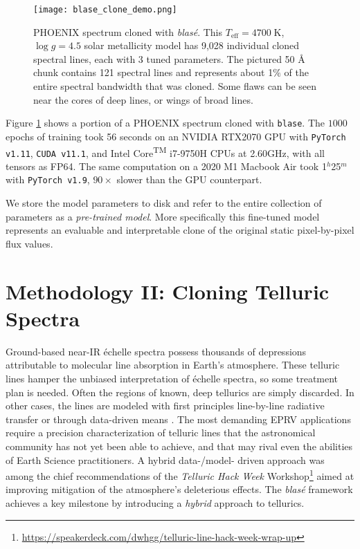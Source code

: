 \documentclass[trackchanges]{aastex631}
\begin{document}
\begin{figure}[hbt!]
    \centering
    \texttt{[image: blase\_clone\_demo.png]}
    \caption{PHOENIX spectrum cloned with \emph{blas\'e}.  This $T_{\mathrm{eff}}=4700\;$K,  $\log{g}=4.5$ solar metallicity model has 9,028 individual cloned spectral lines, each with 3 tuned parameters.  The pictured 50 \AA~ chunk contains 121 spectral lines and represents about 1$\%$ of the entire spectral bandwidth that was cloned.  Some flaws can be seen near the cores of deep lines, or wings of broad lines.}
    \label{fig_cloned_spectrum_demo}
\end{figure}


Figure \ref{fig_cloned_spectrum_demo} shows a portion of a PHOENIX spectrum cloned with \texttt{blase}. The $1000$ epochs of training took 56 seconds on an NVIDIA\textsuperscript{\tiny\textregistered} RTX2070 GPU with \texttt{PyTorch v1.11}, \texttt{CUDA v11.1}, and Intel\textsuperscript{\tiny\textregistered} Core\textsuperscript{\tiny TM} i7-9750H CPUs at 2.60GHz, with all tensors as FP64. The same computation on a 2020 M1 Macbook Air took 1$^h$25$^m$ with \texttt{PyTorch v1.9}, $90\times$ slower than the GPU counterpart.

We store the model parameters to disk and refer to the entire collection of parameters as a \emph{pre-trained model}.  More specifically this fine-tuned model represents an evaluable and interpretable clone of the original static pixel-by-pixel flux values.

\section{Methodology II: Cloning Telluric Spectra} \label{sectionTelluric}
Ground-based near-IR \'echelle spectra possess thousands of depressions attributable to molecular line absorption in Earth's atmosphere.  These telluric lines hamper the unbiased interpretation of \'echelle spectra, so some treatment plan is needed.  Often the regions of known, deep tellurics are simply discarded.  In other cases, the lines are modeled with first principles line-by-line radiative transfer \citep[\emph{e.g.} \texttt{TelFit,}][]{2014AJ....148...53G, 2005JQSRT..91..233C} or through data-driven means \citep[\emph{e.g.} \texttt{wobble,}][]{2019AJ....158..164B}.  The most demanding EPRV applications require a precision characterization of telluric lines that the astronomical community has not yet been able to achieve, and that may rival even the abilities of Earth Science practitioners.  A hybrid data-/model- driven approach was among the chief recommendations of the \emph{Telluric Hack Week} Workshop\footnote{\url{https://speakerdeck.com/dwhgg/telluric-line-hack-week-wrap-up}} aimed at improving mitigation of the atmosphere's deleterious effects.  The  \emph{blas\'e} framework achieves a key milestone by introducing a \emph{hybrid} approach to tellurics.
\end{document}
